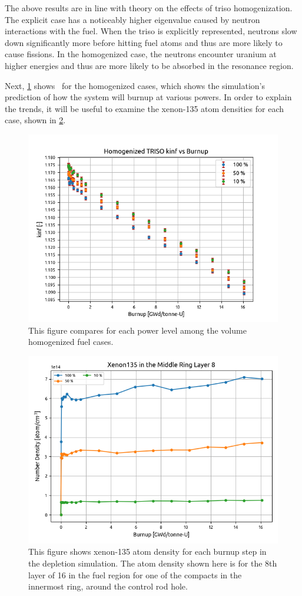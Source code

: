 \documentclass[letterpaper]{physor2024}
\begin{document}
The above results are in line with theory on the effects of \gls{triso} homogenization. The explicit case has a noticeably higher eigenvalue caused by neutron interactions with the fuel. When the \gls{triso} is explicitly represented, neutrons slow down significantly more before hitting fuel atoms and thus are more likely to cause fissions. In the homogenized case, the neutrons encounter uranium at higher energies and thus are more likely to be absorbed in the resonance region.

Next, \cref{fig:all_powers_kinf_vs_burnup} shows \kinf~for the homogenized cases, which shows the simulation's prediction of how the system will burnup at various powers. In order to explain the trends, it will be useful to examine the xenon-135 atom densities for each case, shown in \cref{fig:homog_xenons}.
\vspace*{-0.45cm}
\begin{figure}[!h]
    \centering
    \includegraphics[width=0.65\linewidth]{figures/all_homog_burnup_as_function_of_keff.png}
    \caption{This figure compares \kinf for each power level among the volume homogenized fuel cases.}
    \label{fig:all_powers_kinf_vs_burnup}
\end{figure}
\vspace*{-0.7cm}
\begin{figure}[!h]
    \centering
    \includegraphics[width=0.6\linewidth]{figures/mid_compact_layer_8_Xe135.png}
    \caption{This figure shows xenon-135 atom density for each burnup step in the depletion simulation. The atom density shown here is for the 8th layer of 16 in the fuel region for one of the compacts in the innermost ring, around the control rod hole. }
    \label{fig:homog_xenons}
\end{figure}
\end{document}
